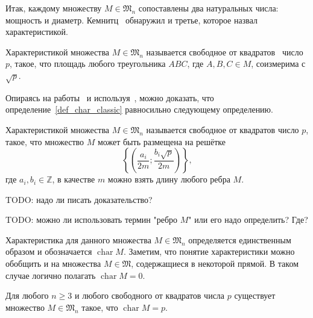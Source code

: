 Итак, каждому множеству $M\in\mathfrak{M}_n$ сопоставлены
два натуральных числа: мощность и диаметр.
Кемнитц~\cite{kemnitz1988punktmengen} обнаружил и третье,
которое назвал характеристикой.

\begin{definition}
	\label{def_char_classic}
	Характеристикой множества $M\in\mathfrak{M}_n$ называется свободное от квадратов~\cite[гл. 34, п. 3]{Bukhstab-number-theory}
	число $p$, такое, что площадь любого треугольника $ABC$, где $A,B,C\in M$,
	соизмерима с $\sqrt{p}$.
\end{definition}

Опираясь на работы~\cite{our-mkmitu-2016,our-ped-2017} и используя~\cite[теорема 3.1]{polygons-on-lattices},
можно доказать, что определение~\ref{def_char_classic} равносильно следующему определению.
\begin{definition}
	\label{def_char_classic}
	Характеристикой множества $M\in\mathfrak{M}_n$ называется свободное от квадратов
	число $p$, такое, что множество $M$ может быть размещена на решётке
\begin{equation}\label{grid_for_Erdosh_system}
	\left\{\left(
		\frac{a_i}{2m}
		;
		\frac{b_i\sqrt{p}}{2m}
	\right)\right\},
\end{equation}
где $a_i, b_i \in \mathbb{Z}$, в качестве $m$ можно взять длину любого ребра $M$.
\end{definition}

TODO: надо ли писать доказательство?

TODO: можно ли использовать термин "ребро $M$" или его надо определить? Где?

Характеристика для данного множества $M\in\mathfrak{M}_n$ определяется единственным образом и обозначается $\operatorname{char}M$.
Заметим, что понятие характеристики можно обобщить и на множества $M\in\mathfrak{M}$,
содержащиеся в некоторой прямой.
В таком случае логично полагать $\operatorname{char} M = 0$.



\begin{theorem}
	Для любого $n\geq 3$ и любого свободного от квадратов числа $p$
	существует множество $M\in\mathfrak{M}_n$ такое, что $\operatorname{char} M = p$.
\end{theorem}

